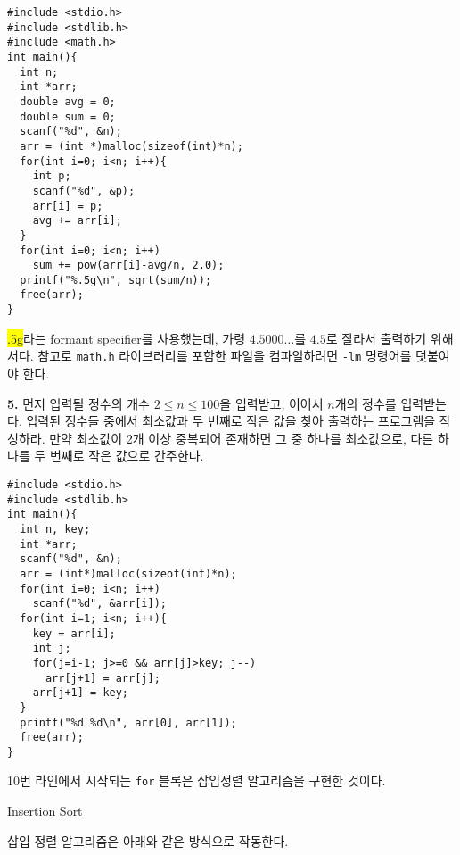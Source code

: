 \documentclass[a4paper,chapter,atbegshi]{oblivoir}
\begin{document}
\begin{lstlisting}[style=C]
#include <stdio.h>
#include <stdlib.h>
#include <math.h>
int main(){
  int n;
  int *arr;
  double avg = 0;
  double sum = 0;
  scanf("%d", &n);
  arr = (int *)malloc(sizeof(int)*n);
  for(int i=0; i<n; i++){
    int p;
    scanf("%d", &p);
    arr[i] = p;
    avg += arr[i];
  }
  for(int i=0; i<n; i++)
    sum += pow(arr[i]-avg/n, 2.0);
  printf("%.5g\n", sqrt(sum/n));
  free(arr);
}
\end{lstlisting}
\colorbox{yellow}{\ttfamily .5g}라는 formant specifier를
사용했는데, 가령 $4.5000\ldots$를 $4.5$로 잘라서 출력하기 위해서다. 참고로
\texttt{math.h} 라이브러리를 포함한 파일을 컴파일하려면 \texttt{-lm} 명령어를
덧붙여야 한다.
\hfill\break
\begin{mdframed}\textbf{5. }
  먼저 입력될 정수의 개수 $2\leq n\leq 100$을 입력받고, 이어서 $n$개의 정수를
  입력받는다. 입력된 정수들 중에서 최소값과 두 번째로 작은 값을 찾아
  출력하는 프로그램을 작성하라. 만약 최소값이 2개 이상 중복되어 존재하면
  그 중 하나를 최소값으로, 다른 하나를 두 번째로 작은 값으로 간주한다.
\end{mdframed}
\begin{lstlisting}[style=C]
#include <stdio.h>
#include <stdlib.h>
int main(){
  int n, key;
  int *arr;
  scanf("%d", &n);
  arr = (int*)malloc(sizeof(int)*n);
  for(int i=0; i<n; i++)
    scanf("%d", &arr[i]);
  for(int i=1; i<n; i++){
    key = arr[i];
    int j;
    for(j=i-1; j>=0 && arr[j]>key; j--)
      arr[j+1] = arr[j];
    arr[j+1] = key;
  }
  printf("%d %d\n", arr[0], arr[1]);
  free(arr);
}
\end{lstlisting}
10번 라인에서 시작되는 \texttt{for} 블록은 삽입정렬 알고리즘을 구현한 것이다.
\begin{algorithm}
  \caption{Insertion Sort}
\end{algorithm}
삽입 정렬 알고리즘은 아래와 같은 방식으로 작동한다.
\end{document}
